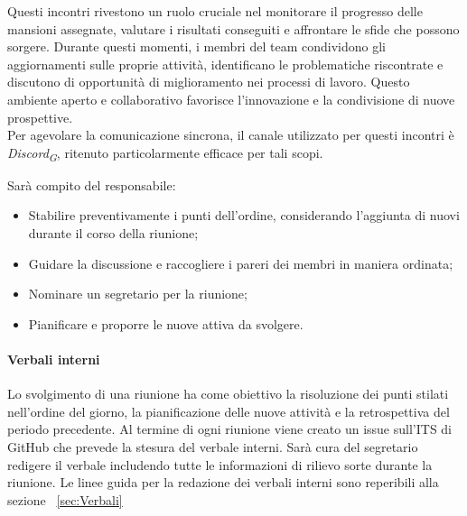 Questi incontri rivestono un ruolo cruciale nel monitorare il progresso delle mansioni assegnate, valutare i risultati conseguiti e affrontare le sfide che possono sorgere. Durante questi momenti, i membri del team condividono gli aggiornamenti sulle proprie attività, identificano le problematiche riscontrate e discutono di opportunità di miglioramento nei processi di lavoro. Questo ambiente aperto e collaborativo favorisce l'innovazione e la condivisione di nuove prospettive.\\

Per agevolare la comunicazione sincrona, il canale utilizzato per questi incontri è \textit{Discord}\textsubscript{\textit{G}}, ritenuto particolarmente efficace per tali scopi.

\vspace{0,1cm}

Sarà compito del responsabile:
\begin{itemize}
    \item Stabilire preventivamente i punti dell'ordine, considerando l'aggiunta di nuovi durante il corso della riunione;
    \item Guidare la discussione e raccogliere i pareri dei membri in maniera ordinata;
    \item Nominare un segretario per la riunione;
    \item Pianificare e proporre le nuove attiva da svolgere.
\end{itemize}
\paragraph*{Verbali interni}
Lo svolgimento di una riunione ha come obiettivo la risoluzione dei punti stilati nell'ordine del giorno, la pianificazione delle nuove attività e la retrospettiva del periodo precedente.
Al termine di ogni riunione viene creato un issue sull'ITS di GitHub che prevede la stesura del verbale interni. Sarà cura del segretario redigere il verbale includendo
tutte le informazioni di rilievo sorte durante la riunione.
Le linee guida per la redazione dei verbali interni sono reperibili alla sezione  ~\ref{sec:Verbali}

